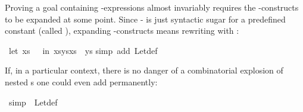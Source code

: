 %
\begin{isabellebody}%
%
%
\begin{isamarkuptext}%
Proving a goal containing -expressions almost invariably
requires the -con\-structs to be expanded at some point. Since
- is just syntactic sugar for a predefined constant
(called ), expanding -constructs means rewriting with
:%
\end{isamarkuptext}%
\ {\isachardoublequote}{\isacharparenleft}let\ xs\ {\isacharequal}\ {\isacharbrackleft}{\isacharbrackright}\ in\ xs{\isacharat}ys{\isacharat}xs{\isacharparenright}\ {\isacharequal}\ ys{\isachardoublequote}\isanewline
{}simp\ add{\isacharcolon}\ Let{\isacharunderscore}def{\isacharparenright}%
\begin{isamarkuptext}%
If, in a particular context, there is no danger of a combinatorial explosion
of nested s one could even add  permanently:%
\end{isamarkuptext}%
\ {\isacharbrackleft}simp{\isacharbrackright}\ {\isacharequal}\ Let{\isacharunderscore}def\end{isabellebody}%
